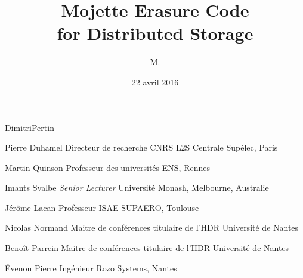



\title{Mojette Erasure Code\\
    for Distributed Storage}



\author{M.}{Dimitri}{Pertin}






\thesisnumber{}

\date{22 avril 2016}

    {Pierre}
    {Duhamel}
    {Directeur de recherche CNRS}
    {L2S Centrale Supélec, Paris}

    {Martin}
    {Quinson}
    {Professeur des universités}
    {ENS, Rennes}

    {Imants}
    {Svalbe}
    {\emph{Senior Lecturer}}
    {Université Monash, Melbourne, Australie}

    {Jérôme}
    {Lacan}
    {Professeur}
    {ISAE-SUPAERO, Toulouse}

    {Nicolas}
    {Normand}
    {Maitre de conférences titulaire de l'HDR}
    {Université de Nantes}
 
    {Benoît}
    {Parrein}
    {Maitre de conférences titulaire de l'HDR}
    {Université de Nantes}   

    {Évenou}
    {Pierre}
    {Ingénieur}
    {Rozo Systems, Nantes}




